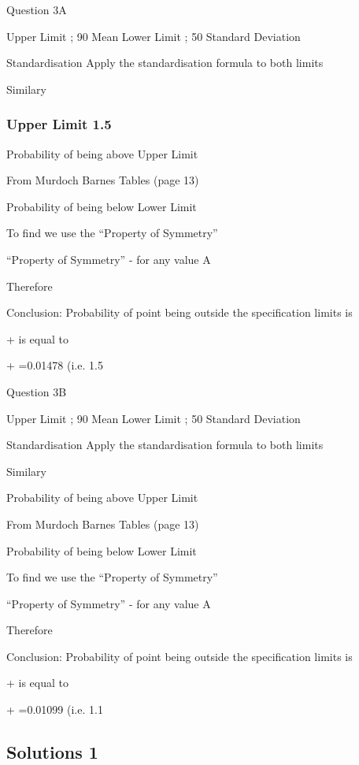 Question 3A

Upper Limit ; 90		Mean		 	
Lower Limit ; 50		Standard Deviation	 

Standardisation
Apply the standardisation formula	 	to both limits


Similary


\subsubsection{Upper Limit 1.5}
Probability of being above Upper Limit

From Murdoch Barnes Tables (page 13)  

Probability of being below Lower Limit


To find   we use the “Property of Symmetry”

“Property of Symmetry” -   for any value A

Therefore 

Conclusion: 
Probability of point being outside the specification limits is

+ is equal to


+ =0.01478  	(i.e. 1.5%






Question 3B

Upper Limit ; 90		Mean		 	
Lower Limit ; 50		Standard Deviation	 

Standardisation
Apply the standardisation formula	 	to both limits


Similary



Probability of being above Upper Limit

From Murdoch Barnes Tables (page 13)  

Probability of being below Lower Limit


To find   we use the “Property of Symmetry”

“Property of Symmetry” -   for any value A

Therefore 

Conclusion: 
Probability of point being outside the specification limits is

+ is equal to

+ =0.01099  	(i.e. 1.1%







\subsection{Solutions 1}

